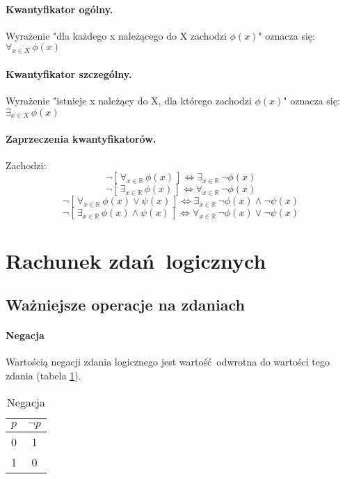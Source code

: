         \paragraph{Kwantyfikator ogólny.} Wyrażenie "dla każdego x należącego do X zachodzi $\phi(x)$" oznacza się: $\forall_{x \in X} \, \phi(x)$
        \paragraph{Kwantyfikator szczególny.} Wyrażenie "istnieje x należący do X, dla którego zachodzi $\phi(x)$" oznacza się: $\exists_{x \in X} \, \phi(x)$
        \paragraph{Zaprzeczenia kwantyfikatorów.} Zachodzi:
        \begin{equation*}
            \neg [\,\forall_{x \in \mathbb{R}} \, \phi(x)\,] \Leftrightarrow \exists_{x \in \mathbb{R}} \, \neg \phi(x)
        \end{equation*}
        \begin{equation*}
            \neg [\,\exists_{x \in \mathbb{R}} \, \phi(x)\,] \Leftrightarrow \forall_{x \in \mathbb{R}} \, \neg \phi(x)
        \end{equation*}
        \begin{equation*}
            \neg [\,\forall_{x \in \mathbb{R}} \, \phi(x) \vee \psi(x)\,] \Leftrightarrow \exists_{x \in \mathbb{R}} \, \neg \phi(x) \wedge \neg \psi(x)
        \end{equation*}
        \begin{equation*}
            \neg [\,\exists_{x \in \mathbb{R}} \, \phi(x) \wedge \psi(x)\,] \Leftrightarrow \forall_{x \in \mathbb{R}} \, \neg \phi(x) \vee \neg \psi(x)
        \end{equation*}

\section{Rachunek zdań logicznych}
    \subsection{Ważniejsze operacje na zdaniach}
        \paragraph{Negacja}
        Wartością negacji zdania logicznego jest wartość odwrotna do wartości tego zdania (tabela \ref{tab:negacja}).
        \begin{table}[htbp!]
            \centering
            \caption{Negacja}
            \label{tab:negacja}
            \vspace{3mm}
            \begin{tabular}{cc}
                \textbf{$p$} & \textbf{$\neg p$} \\
                \midrule
                0 & 1\\
                1 & 0 \\
                \bottomrule
            \end{tabular}
        \end{table}

